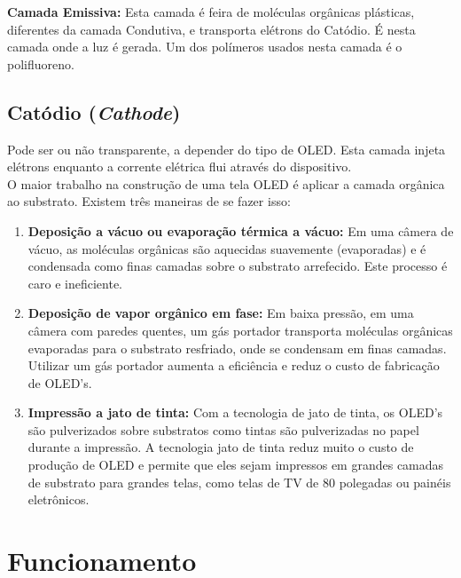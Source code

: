 {\bf Camada Emissiva:} Esta camada é feira de moléculas orgânicas plásticas, diferentes da camada Condutiva, e transporta elétrons do Catódio. É nesta camada onde a luz é gerada. Um dos polímeros usados nesta camada é o polifluoreno. 


\subsection{Catódio (\textit{Cathode})}
\label{sec:catodio}

Pode ser ou não transparente, a depender do tipo de OLED. Esta camada injeta elétrons enquanto a corrente elétrica flui através do dispositivo. \\

O maior trabalho na construção de uma tela OLED é aplicar a camada orgânica ao substrato. Existem três maneiras de se fazer isso:

\begin{enumerate}
	\item {\bf Deposição a vácuo ou evaporação térmica a vácuo:} Em uma câmera de vácuo, as moléculas orgânicas são aquecidas suavemente (evaporadas) e é condensada como finas camadas sobre o substrato arrefecido. Este processo é caro e ineficiente.

	\item {\bf Deposição de vapor orgânico em fase:} Em baixa pressão, em uma câmera com paredes quentes, um gás portador transporta moléculas orgânicas evaporadas para o substrato resfriado, onde se condensam em finas camadas. Utilizar um gás portador aumenta a eficiência e reduz o custo de fabricação de OLED's.

	\item {\bf Impressão a jato de tinta:} Com a tecnologia de jato de tinta, os OLED's são pulverizados sobre substratos como tintas são pulverizadas no papel durante a impressão. A tecnologia jato de tinta reduz muito o custo de produção de OLED e permite que eles sejam impressos em grandes camadas de substrato para grandes telas, como telas de TV de 80 polegadas ou painéis eletrônicos.
\end{enumerate}


\section{Funcionamento}
\label{sec:funcionamento}

